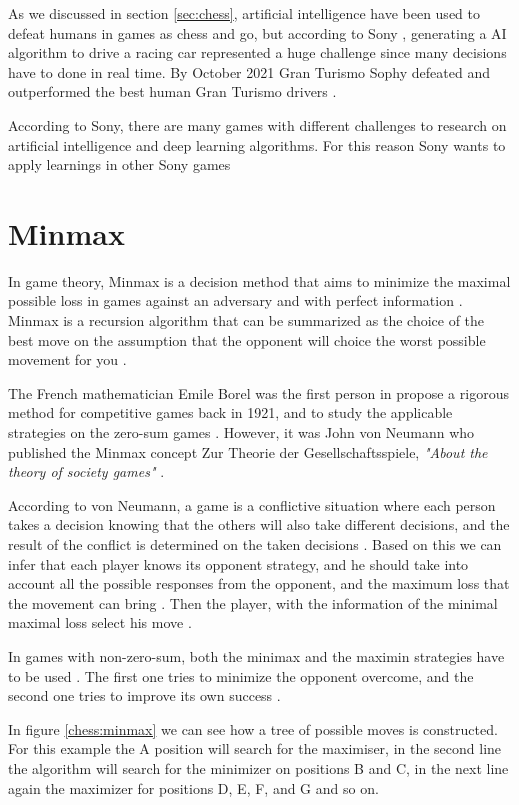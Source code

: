 \documentclass[conference]{IEEEtran}
\begin{document}
As we discussed in section \ref{sec:chess}, artificial intelligence have been used to defeat humans in games as chess and go, but according to Sony \cite{sony}, generating a AI algorithm to drive a racing car represented a huge challenge since many decisions have to done in real time. By October 2021 Gran Turismo Sophy defeated and outperformed the best human Gran Turismo drivers \cite{sony}.

According to Sony, there are many games with different challenges to research on artificial intelligence and deep learning algorithms. For this reason Sony wants to apply learnings in other Sony games \cite{sony}

\section{Minmax}

In game theory, Minmax is a decision method that aims to minimize the maximal possible loss in games against an adversary and with perfect information \cite{nature}. Minmax is a recursion algorithm that can be summarized as the choice of the best move on the assumption that the opponent will choice the worst possible movement for you \cite{nature}.

The French mathematician Emile Borel was the first person in propose a rigorous method for competitive games back in 1921, and to study the applicable strategies on the zero-sum games \cite{nature}. However, it was John von Neumann who published the Minmax concept Zur Theorie der Gesellschaftsspiele, \textit{"About the theory of society games"} \cite{nature}.

According to von Neumann, a game is a conflictive situation where each person takes a decision knowing that the others will also take different decisions, and the result of the conflict is determined on the taken decisions \cite{nature}. Based on this we can infer that each player knows its opponent strategy, and he should take into account all the possible responses from the opponent, and the maximum loss that the movement can bring \cite{nature}. Then the player, with the information of the minimal maximal loss select his move \cite{nature}.

In games with non-zero-sum, both the minimax and the maximin strategies have to be used \cite{nature}. The first one tries to minimize the opponent overcome, and the second one tries to improve its own success \cite{nature}.

In figure \ref{chess:minmax} we can see how a tree of possible moves is constructed. For this example the A position will search for the maximiser, in the second line the algorithm will search for the minimizer on positions B and C, in the next line again the maximizer for positions D, E, F, and G and so on.
\end{document}
